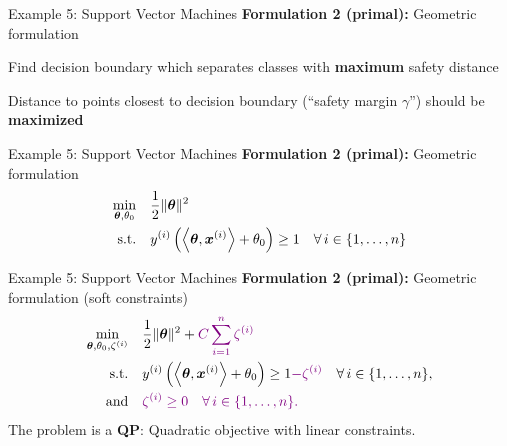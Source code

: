 \documentclass[11pt,compress,t,notes=noshow, xcolor=table]{beamer}
\begin{document}
\begin{framev}{Example 5: Support Vector Machines}
\textbf{Formulation 2 (primal): } Geometric formulation
\begin{itemizeL}
\item Find decision boundary which separates classes with \textbf{maximum} safety distance
\item Distance to points closest to decision boundary (\enquote{safety margin $\gamma$}) should be \textbf{maximized}
\end{itemizeL}
\vfill
{}
\end{framev}


\begin{framev}{Example 5: Support Vector Machines}
\textbf{Formulation 2 (primal): } Geometric formulation
$$
\begin{aligned}
\min\limits_{\bm{\theta}, \theta_0} \quad & \frac{1}{2} \|\bm{\theta}\|^2 \\
\text{s.t.} \quad & y^{(i)}  \left( \left\langle \bm{\theta}, \bm{x}^{(i)} \right\rangle + \theta_0 \right) \ge 1 \quad \forall\, i \in \{1, \ldots, n\}
\end{aligned}
$$
\spacer
{}
\end{framev}


\begin{framev}{Example 5: Support Vector Machines}
\textbf{Formulation 2 (primal): } Geometric formulation (soft constraints)
$$
\begin{aligned}
\min\limits_{\bm{\theta}, \theta_0, \zeta^{(i)}} \quad & \frac{1}{2} \|\bm{\theta}\|^2 + \textcolor{violet}{C   \sum_{i=1}^n \zeta^{(i)}} \\
\text{s.t.} \quad & y^{(i)}  \left( \left\langle \bm{\theta}, \bm{x}^{(i)} \right\rangle + \theta_0 \right) \ge 1 \textcolor{violet}{- \zeta^{(i)}} \quad \forall\, i \in \{1, \ldots, n\}, \\
\text{and} \quad & \textcolor{violet}{\zeta^{(i)} \ge 0 \quad \forall\, i \in \{1, \ldots, n\}.}
\end{aligned}
$$
\spacer
The problem is a \textbf{QP}: Quadratic objective with linear constraints.
\end{framev}
\end{document}
